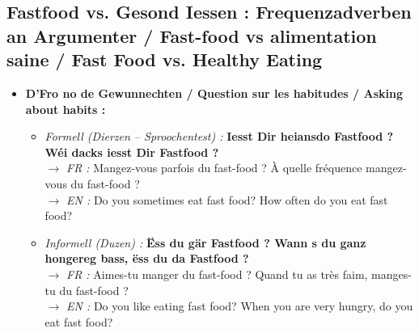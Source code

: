 \subsection{Fastfood vs. Gesond Iessen : Frequenzadverben an Argumenter / Fast-food vs alimentation saine / Fast Food vs. Healthy Eating}

\begin{itemize}
    \item \textbf{D'Fro no de Gewunnechten / Question sur les habitudes / Asking about habits :}
    \begin{itemize}
        \item \textit{Formell (Dierzen -- Sproochentest) :} \textbf{Iesst Dir heiansdo Fastfood ? Wéi dacks iesst Dir Fastfood ?} \\
        $\rightarrow$ \textit{FR :} Mangez-vous parfois du fast-food ? À quelle fréquence mangez-vous du fast-food ? \\
        $\rightarrow$ \textit{EN :} Do you sometimes eat fast food? How often do you eat fast food?
        \item \textit{Informell (Duzen) :} \textbf{Ëss du gär Fastfood ? Wann s du ganz hongereg bass, ëss du da Fastfood ?} \\
        $\rightarrow$ \textit{FR :} Aimes-tu manger du fast-food ? Quand tu as très faim, manges-tu du fast-food ? \\
        $\rightarrow$ \textit{EN :} Do you like eating fast food? When you are very hungry, do you eat fast food?
    \end{itemize}

    \vspace{0.4em}


\end{itemize}
